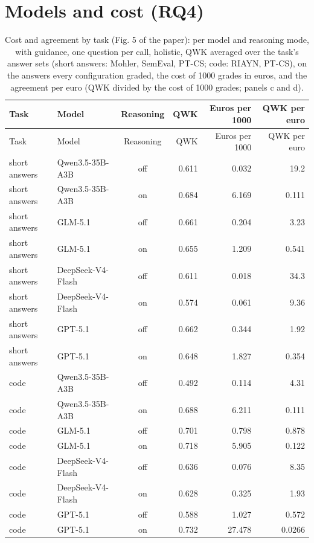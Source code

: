 \documentclass[10pt]{article}
\begin{document}
\section{Models and cost (RQ4)}
\begingroup\footnotesize
\begin{longtable}{llcrrr}
\caption{Cost and agreement by task (Fig. 5 of the paper): per model and reasoning mode, with guidance, one question per call, holistic, QWK averaged over the task's answer sets (short answers: Mohler, SemEval, PT-CS; code: RIAYN, PT-CS), on the answers every configuration graded, the cost of 1000 grades in euros, and the agreement per euro (QWK divided by the cost of 1000 grades; panels c and d).}\\
\hline
Task & Model & Reasoning & QWK & Euros per 1000 & QWK per euro \\ \hline
\endfirsthead
\hline
Task & Model & Reasoning & QWK & Euros per 1000 & QWK per euro \\ \hline
\endhead
short answers & Qwen3.5-35B-A3B & off & 0.611 & 0.032 & 19.2 \\
short answers & Qwen3.5-35B-A3B & on & 0.684 & 6.169 & 0.111 \\
short answers & GLM-5.1 & off & 0.661 & 0.204 & 3.23 \\
short answers & GLM-5.1 & on & 0.655 & 1.209 & 0.541 \\
short answers & DeepSeek-V4-Flash & off & 0.611 & 0.018 & 34.3 \\
short answers & DeepSeek-V4-Flash & on & 0.574 & 0.061 & 9.36 \\
short answers & GPT-5.1 & off & 0.662 & 0.344 & 1.92 \\
short answers & GPT-5.1 & on & 0.648 & 1.827 & 0.354 \\
code & Qwen3.5-35B-A3B & off & 0.492 & 0.114 & 4.31 \\
code & Qwen3.5-35B-A3B & on & 0.688 & 6.211 & 0.111 \\
code & GLM-5.1 & off & 0.701 & 0.798 & 0.878 \\
code & GLM-5.1 & on & 0.718 & 5.905 & 0.122 \\
code & DeepSeek-V4-Flash & off & 0.636 & 0.076 & 8.35 \\
code & DeepSeek-V4-Flash & on & 0.628 & 0.325 & 1.93 \\
code & GPT-5.1 & off & 0.588 & 1.027 & 0.572 \\
code & GPT-5.1 & on & 0.732 & 27.478 & 0.0266 \\
\hline
\end{longtable}
\endgroup
\end{document}
